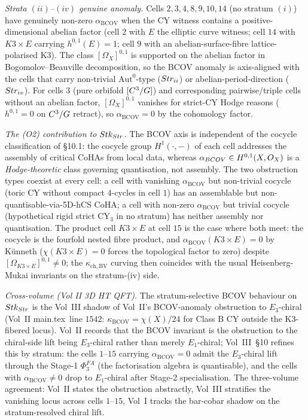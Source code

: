 \emph{Strata $(ii)$--$(iv)$ genuine anomaly.} Cells $2, 3, 4, 8, 9,
10, 14$ (no stratum $(i)$) have genuinely non-zero
$\alpha_{\mathrm{BCOV}}$ when the CY witness contains a
positive-dimensional abelian factor (cell $2$ with $E$ the elliptic
curve witness; cell $14$ with $K3\times E$ carrying $h^{0,1}(E) = 1$;
cell $9$ with an abelian-surface-fibre lattice-polarised K3). The
class $[\Omega_{X}]^{0,1}$ is supported on the abelian factor in
Bogomolov--Beauville decomposition, so the BCOV anomaly is
axis-aligned with the cells that carry non-trivial
$\mathrm{Aut}^{0}$-type ($Str_{ii}$) or abelian-period-direction
($Str_{iv}$). For cells $3$ (pure orbifold $[C^{3}/G]$) and
corresponding pairwise/triple cells without an abelian factor,
$[\Omega_{X}]^{0,1}$ vanishes for strict-CY Hodge reasons
($h^{0,1} = 0$ on $C^{3}/G$ retract), so
$\alpha_{\mathrm{BCOV}} = 0$ by the cohomology factor.

\emph{The (O2) contribution to $Stk_{Str}$.} The BCOV axis is
independent of the cocycle classification of \S 10.1: the cocycle
group $H^{1}(\cdot,-)$ of each cell addresses the assembly of
critical CoHAs from local data, whereas $\alpha_{BCOV} \in
H^{0,1}(X, O_X)$ is a \emph{Hodge-theoretic} class governing
quantisation, not assembly. The two obstruction types coexist at
every cell: a cell with vanishing $\alpha_{\mathrm{BCOV}}$ but
non-trivial cocycle (toric CY without compact $4$-cycles in cell $1$)
has an assemblable but non-quantisable-via-5D-hCS CoHA; a cell with
non-zero $\alpha_{\mathrm{BCOV}}$ but trivial cocycle (hypothetical
rigid strict CY$_{3}$ in no stratum) has neither assembly nor
quantisation. The product cell $K3 \times E$ at cell $15$ is the
case where both meet: the cocycle is the fourfold nested fibre
product, and $\alpha_{\mathrm{BCOV}}(K3 \times E) = 0$ by Künneth
($\chi(K3 \times E) = 0$ forces the topological factor to zero)
despite $[\Omega_{K3 \times E}]^{0,1} \neq 0$; the
$\kappa_{\mathrm{ch,BV}}$ curving then coincides with the usual
Heisenberg-Mukai invariants on the stratum-(iv) side.

\emph{Cross-volume (Vol II 3D HT QFT).} The stratum-selective BCOV
behaviour on $Stk_{Str}$ is the Vol~III shadow of Vol~II's
BCOV-anomaly obstruction to $E_{3}$-chiral (Vol~II main.tex~line
$1542$: $\kappa_{\mathrm{BCOV}} = \chi(X)/24$ for Class B CY outside
the K3-fibered locus). Vol~II records that the BCOV invariant is the
obstruction to the chiral-side lift being $E_{3}$-chiral rather than
merely $E_{1}$-chiral; Vol~III~\S 10 refines this by stratum: the
cells $1$--$15$ carrying $\alpha_{\mathrm{BCOV}} = 0$ admit the
$E_{3}$-chiral lift through the Stage-1 $\Phi^{FA}_{3}$ (the
factorisation algebra is quantisable), and the cells with
$\alpha_{\mathrm{BCOV}} \neq 0$ drop to $E_{1}$-chiral after
Stage-2 specialisation. The three-volume agreement: Vol~II states
the obstruction abstractly, Vol~III stratifies the vanishing locus
across cells $1$--$15$, Vol~I tracks the bar-cobar shadow on the
stratum-resolved chiral lift.

